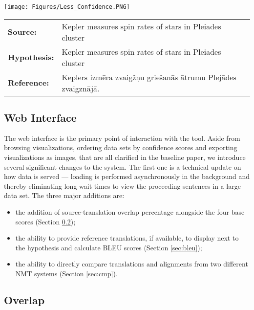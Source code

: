 \documentclass[runningheads,a4paper]{lncs/llncs}
\begin{document}
\begin{figure*}[t]
  \texttt{[image: Figures/Less\_Confidence.PNG]}
  \begin{tabular}{lp{10.4cm}}
   \bf Source: & Kepler measures spin rates of stars in Pleiades cluster \\
   \bf Hypothesis: & Kepler measures spin rates of stars in Pleiades cluster \\
   \bf Reference: & Keplers izmēra zvaigžņu griešanās ātrumu Plejādes zvaigznājā. \\
  \end{tabular}
  \caption{An example of a translated sentence that exhibits a verbatim rendition of the input. CDP: 100.0\%; : 98.84\%; : 98.85\%; Baseline Confidence: \textbf{95.44\%}; Updated Confidence: \textbf{25.02\%}; }  
  \label{fig:less-confidence}
\end{figure*}

\subsection{Web Interface}
\label{sec:web}

The web interface is the primary point of interaction with the tool. Aside from browsing visualizations, ordering data sets by confidence scores and exporting visualizations as images, that are all clarified in the baseline paper, we introduce several significant changes to the system. The first one is a technical update on how data is served --- loading is performed asynchronously in the background and thereby eliminating long wait times to view the proceeding sentences in a large data set. 
The three major additions are:
  \begin{itemize}
    \item the addition of source-translation overlap percentage alongside the four base scores (Section \ref{sec:over});
    \item the ability to provide reference translations, if available, to display next to the hypothesis and calculate BLEU scores (Section \ref{sec:bleu});
    \item the ability to directly compare translations and alignments from two different NMT systems (Section \ref{sec:cmp}).
  \end{itemize}





\subsection{Overlap}
\label{sec:over}
\end{document}
